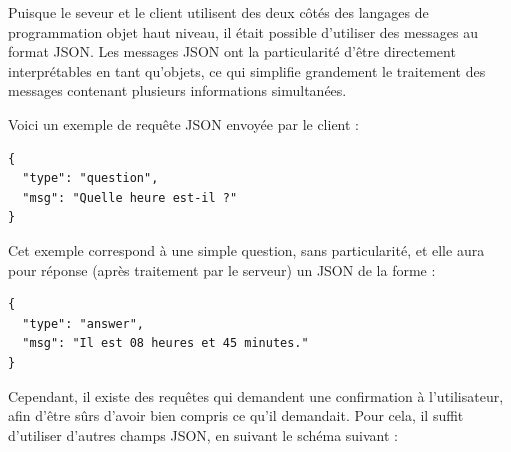 \documentclass{report}
\begin{document}
        {Puisque le seveur et le client utilisent des deux côtés des langages de
        programmation objet
        haut niveau, il était possible d'utiliser des messages au format JSON.
        Les messages JSON ont la particularité d'être directement interprétables
        en tant qu'objets, ce qui simplifie grandement le traitement des messages
        contenant plusieurs informations
        simultanées.\newline}


        {Voici un exemple de requête JSON envoyée par le client :}
        \begin{listing}[h]
          \begin{verbatim}
{
  "type": "question",
  "msg": "Quelle heure est-il ?"
}
          \end{verbatim}
        \end{listing}

        {Cet exemple correspond à une simple question, sans particularité, et elle
        aura pour réponse (après traitement par le serveur) un JSON de la forme :}

        \begin{listing}[h]
          \begin{verbatim}
{
  "type": "answer",
  "msg": "Il est 08 heures et 45 minutes."
}
          \end{verbatim}
        \end{listing}

        {Cependant, il existe des requêtes qui demandent une confirmation à
        l'utilisateur, afin d'être sûrs d'avoir bien compris ce qu'il demandait.
        Pour cela, il suffit d'utiliser d'autres champs JSON,
        en suivant le schéma suivant :}

        \newpage
\end{document}
